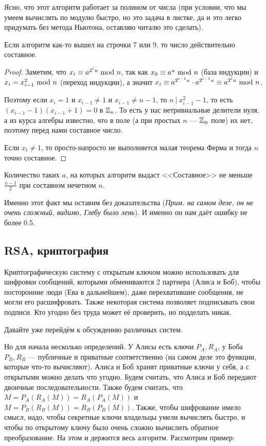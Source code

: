 \documentclass[a4paper, 12pt]{article}
\begin{document}
Ясно, что этот алгоритм работает за полином от числа (при условии, что
мы умеем вычислять по модулю быстро, но это задача в листке, да и это легко 
придумать без метода Ньютона, оставляю читалю это сделать).

\begin{Lemma}
  Если алгоритм как-то вышел на строчки 7 или 9, то число действительно 
  составное.
\end{Lemma}

\begin{proof}
  Заметим, что $x_i \equiv a^{2^i u} \ \text{mod} \  n$, так как $x_0 \equiv a^{u} \ \text{mod} \  n$
  (база индукции) и 
  $x_i = x_{i - 1}^2 \ \text{mod} \  n$ (переход индукции), а значит $x_i \equiv a^{2^{i -
  1} u} \cdot
  a^{2^{i - 1} u} \equiv a^{2^{i} u} \ \text{mod} \  n$. 

  Поэтому если $x_i = 1$ и $x_{i - 1} \neq 1$ и $x_{i - 1} \neq n - 1$, то 
  $n \ | \ x_{i - 1}^2 - 1$, то есть $(x_{i - 1} - 1)(x_{i - 1} + 1) = 0$ в 
  $\mathbb{Z}_n$.
  То есть у нас нетривиальные делители нуля, а из курса алгебры известно, что в
  поле (а при простых $n$ --- $\mathbb{Z}_n$ поле) их нет, поэтому перед нами составное 
  число.

  Если $x_t \neq 1$, то просто-напросто не выполняется малая теорема Ферма и 
  тогда $n$ точно составное.
\end{proof}

\begin{Lemma}
Количество таких $a$, 
на которых алгоритм выдаст <<Составное>> не меньше $\frac{n - 1}{2}$ при
составном нечетном $n$.
\end{Lemma}

Именно этот факт мы оставим без доказательства ({\it Прим. на самом деле, он не 
очень сложный, видимо, Глебу было лень}).
И именно он нам даёт ошибку не более 0.5.

\subsection{RSA, криптография}

Криптографическую систему с открытым ключом можно использовать для шифровки
сообщений, которыми обмениваются 2 партнера (Алиса и Боб), чтобы посторонние
люди (Ева в дальнейшем), даже перехватившие сообщения,
не могли его расшифровать. Также некоторая система позволяет подписывать 
свои подписи. Кто угодно без труда может её проверить, но подделать никак.

Давайте уже перейдём к обсуждению различных систем.

Но для начала несколько определений. У Алисы есть 
ключи $P_{A}, R_{A}$, у Боба $P_{B}, R_{B}$ --- 
публичные и приватные соответственно (на самом деле это функции, которые 
что-то вычисляют). Алиса и Боб хранят приватные ключи у себя,
а с открытыми можно делать что угодно. Будем считать, что Алиса и Боб передают
двоичные последовательности. Также будем считать, что $M = P_{A}(R_{A}(M)) = R_{
A}(P_{A}(M))$ и $M = P_{B}(R_{B}(M)) = R_{B}(P_{B}(M))$. Также, чтобы шифрование
имело смысл, надо, чтобы секретные ключи владельцы умели вычислять быстро, и
чтобы по открытому ключу было очень сложно вычислить обратное преобразование.
На этом и держится весь алгоритм. Рассмотрим пример:
\end{document}
